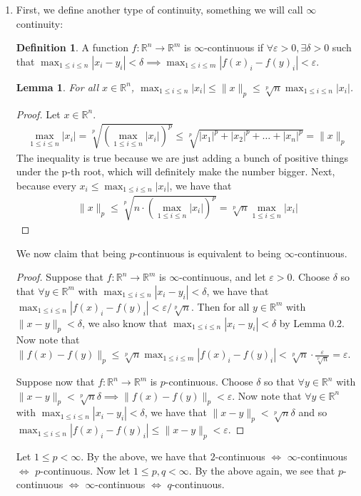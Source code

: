 \documentclass[12pt]{article}
\newtheorem{lemma}[theorem]{Lemma}
\theoremstyle{definition}
\newtheorem{definition}{Definition}[section]
\theoremstyle{remark}
\newcommand{\R}{\mathbb{R}}
\newcommand{\mg}[1]{\| #1 \|}
\newcommand{\linf}[1]{\max_{1\leq i \leq #1}}
\newcommand{\ve}{\varepsilon}
\begin{document}
\begin{enumerate}[leftmargin=\labelsep]
		\item 
		First, we define another type of continuity, something we will call $\infty$ continuity:
		\begin{definition}
			A function $f: \R^n \to \R^m$ is $\infty$-continuous if $\forall \varepsilon > 0, \exists \delta > 0$ such that $\max_{1\leq i \leq n} |x_i-y_i| < \delta \implies \linf{m} |f(x)_i-f(y)_i| < \varepsilon$.
			\end{definition}
		\begin{lemma}
			For all $x \in \R^n$, $\linf{n} |x_i| \leq \|x\|_p \leq \sqrt[p]{n} \linf{n} |x_i|$.
		\end{lemma}
		\begin{proof}
			Let $x \in \R^n$. 
			\begin{align*}
				\linf{n} |x_i| = \sqrt[p]{\left(\linf{n} |x_i|\right)^p} \leq \sqrt[p]{|x_1|^p+|x_2|^p + \ldots + |x_n|^p} = \mg{x}_p
			\end{align*}
			The inequality is true because we are just adding a bunch of positive things under the p-th root, which will definitely make the number bigger. Next, because every $x_i \leq \linf{n} |x_i|$, we have that
			\begin{align*}
				\mg{x}_p \leq \sqrt[p]{n \cdot \left(\linf{n} |x_i|\right)^p} = \sqrt[p]{n} \linf{n} |x_i|
			\end{align*}
		\end{proof}
		We now claim that being $p$-continuous is equivalent to being $\infty$-continuous.
		\begin{proof}
		    \fbox{$\implies$}
			
			Suppose that $f: \R^n \to \R^m$ is $\infty$-continuous, and let $\ve > 0$. Choose $\delta$ so that $\forall y \in \R^m$ with $\linf{n} |x_i-y_i| < \delta$, we have that $\linf{n} |f(x)_i - f(y)_i| < \ve / \sqrt[p]{n}$. Then for all $y \in \R^m$ with $\mg{x-y}_p < \delta$, we also know that $\linf{n}|x_i-y_i| < \delta$ by Lemma 0.2. Now note that $\mg{f(x)-f(y)}_p \leq \sqrt[p]{n}\linf{m} |f(x)_i -f(y)_i| < \sqrt[p]{n} \cdot \frac{\ve}{\sqrt[p]{n}}=\ve$. 	
			
			\fbox{$\impliedby$}
			
			Suppose now that $f:\R^n \to \R^m$ is $p$-continuous. Choose $\delta$ so that $\forall y \in \R^n$ with $\mg{x-y}_p < \sqrt[p]{n}\delta \implies \mg{f(x)-f(y)}_p < \ve$. Now note that $\forall y \in \R^n$ with $ \linf{n}|x_i-y_i| < \delta$, we have that $\mg{x-y}_p < \sqrt[p]{n}\delta$ and so $\linf{n} |f(x)_i-f(y)_i| \leq \mg{x-y}_p < \ve$.
		\end{proof}
		Let $1\leq p < \infty$. By the above, we have that $2$-continuous $\iff$ $\infty$-continuous $\iff$ $p$-continuous. Now let $1 \leq p,q < \infty$. By the above again, we see that $p$-continuous $\iff$ $\infty$-continuous $\iff$ $q$-continuous.
		\end{enumerate}
		
\end{document}
